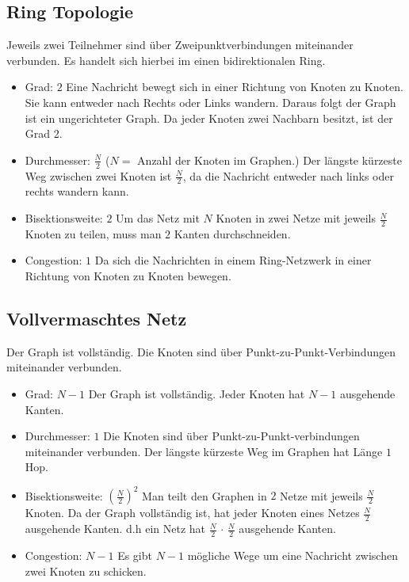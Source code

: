 \subsection{Ring Topologie}
 Jeweils zwei Teilnehmer sind über Zweipunktverbindungen miteinander verbunden.
 Es handelt sich hierbei im einen bidirektionalen Ring.
\begin{itemize}
  \item Grad: $2$
  \newline Eine Nachricht bewegt sich in einer Richtung von Knoten zu Knoten.
  Sie kann entweder nach Rechts oder Links wandern. Daraus folgt der Graph ist
  ein ungerichteter Graph. Da jeder Knoten zwei Nachbarn besitzt, ist der Grad 2.
  \item Durchmesser: $\frac{N}{2}$ ($N =$ Anzahl der Knoten im Graphen.)
   \newline Der längste kürzeste Weg zwischen zwei Knoten ist $\frac{N}{2}$, da
   die Nachricht entweder nach links oder rechts wandern kann.
  \item Bisektionsweite: $2$
  \newline  Um das Netz mit $N$ Knoten in zwei Netze mit jeweils $\frac{N}{2}$
  Knoten zu teilen, muss man $2$ Kanten durchschneiden.
  \item Congestion: $1$
  \newline Da sich die Nachrichten in einem Ring-Netzwerk in einer Richtung von
  Knoten zu Knoten bewegen.
\end{itemize}

\subsection{Vollvermaschtes Netz}
Der Graph ist vollständig. Die Knoten sind über Punkt-zu-Punkt-Verbindungen
miteinander verbunden.
\begin{itemize}
  \item Grad: $N-1$
  \newline Der Graph ist vollständig. Jeder Knoten hat $N-1$ ausgehende Kanten.
  \item Durchmesser: $1$
   \newline Die Knoten sind über Punkt-zu-Punkt-verbindungen miteinander
   verbunden. Der längste kürzeste Weg  im Graphen hat Länge $1$ Hop.
  \item Bisektionsweite: $ \left( \frac{N}{2}\right)^2$
  \newline Man teilt den Graphen in $2$ Netze mit jeweils $\frac{N}{2}$ Knoten.
  Da der Graph vollständig ist, hat jeder Knoten eines Netzes  $\frac{N}{2}$
  ausgehende Kanten. d.h ein Netz hat $\frac{N}{2} \, \cdot \, \frac{N}{2}$
  ausgehende Kanten.
  \item Congestion: $N-1$
  \newline Es gibt $N-1$ mögliche Wege um eine Nachricht zwischen zwei Knoten zu
  schicken.
\end{itemize}


